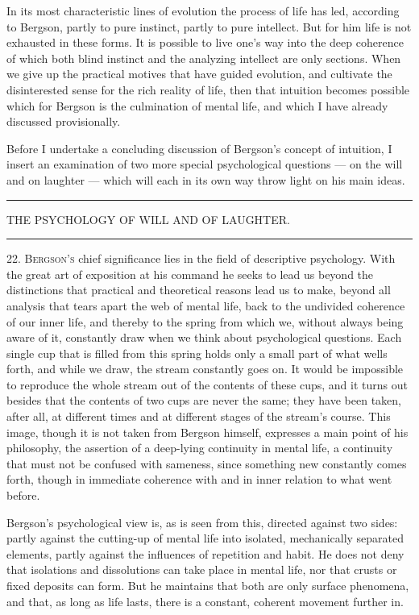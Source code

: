 \documentclass[12pt,a4paper,openany]{book}
\newcommand{\opage}[1]{\marginnote{\footnotesize\textit{[#1]}}}
\newcommand{\chapterhead}[1]{\clearpage\phantomsection\addcontentsline{toc}{chapter}{#1}\vspace*{3cm}\begin{center}{\large #1}\\[6pt]\rule{1.2cm}{0.4pt}\end{center}\medskip}
\newcommand{\initial}[2]{{\Large #1}\textsc{#2}}
\newcommand{\chapterend}{\par\begin{center}\rule{2.5cm}{0.4pt}\end{center}}
\begin{document}
In its most characteristic lines of evolution the process of life has led, according to Bergson, partly to pure instinct, partly to pure intellect. But for him life is not exhausted in these forms. It is possible to live one's way into the deep coherence of which both blind instinct and the analyzing intellect are only sections. When we give up the practical motives that have guided evolution, and cultivate the disinterested sense for the rich reality of life, then that intuition becomes possible which for Bergson is the culmination of mental life, and which I have already discussed provisionally.

Before I undertake a concluding discussion of Bergson's concept of intuition, I insert an examination of two more special psychological questions --- on the will and on laughter --- which will each in its own way throw light on his main ideas.

\chapterend

\chapterhead{THE PSYCHOLOGY OF WILL AND OF LAUGHTER.}

\opage{43}22. \initial{B}{ergson's} chief significance lies in the field of descriptive psychology. With the great art of exposition at his command he seeks to lead us beyond the distinctions that practical and theoretical reasons lead us to make, beyond all analysis that tears apart the web of mental life, back to the undivided coherence of our inner life, and thereby to the spring from which we, without always being aware of it, constantly draw when we think about psychological questions. Each single cup that is filled from this spring holds only a small part of what wells forth, and while we draw, the stream constantly goes on. It would be impossible to reproduce the whole stream out of the contents of these cups, and it turns out besides that the contents of two cups are never the same; they have been taken, after all, at different times and at different stages of the stream's course. This image, though it is not taken from Bergson himself, expresses a main point of his philosophy, the assertion of a deep-lying continuity in mental life, a continuity that must not be confused with sameness, since something new constantly comes forth, though in immediate coherence with and in inner relation to what went before.

Bergson's psychological view is, as is seen from this, directed against two sides: partly against the cutting-up of mental life into isolated, mechanically separated elements, partly against the influences of repetition and habit. He does not deny that isolations and dissolutions can take place in mental life, nor that crusts or fixed deposits can form. But he maintains that
\opage{44}both are only surface phenomena, and that, as long as life lasts, there is a constant, coherent movement further in.
\end{document}
